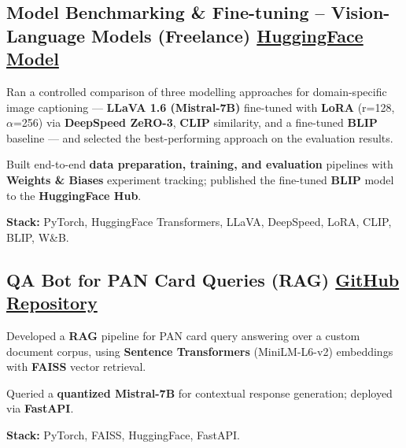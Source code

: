\documentclass[letter,10pt]{article}
\begin{document}
\subsection{Model Benchmarking \& Fine-tuning -- Vision-Language Models (Freelance) \hfill \href{https://huggingface.co/sunil448832/blip-model}{HuggingFace Model}}
\begin{zitemize}
\item Ran a controlled comparison of three modelling approaches for domain-specific image captioning --- \textbf{LLaVA 1.6 (Mistral-7B)} fine-tuned with \textbf{LoRA} (r=128, $\alpha$=256) via \textbf{DeepSpeed ZeRO-3}, \textbf{CLIP} similarity, and a fine-tuned \textbf{BLIP} baseline --- and selected the best-performing approach on the evaluation results.
\item Built end-to-end \textbf{data preparation, training, and evaluation} pipelines with \textbf{Weights \& Biases} experiment tracking; published the fine-tuned \textbf{BLIP} model to the \textbf{HuggingFace Hub}.
\item \textbf{Stack:} PyTorch, HuggingFace Transformers, LLaVA, DeepSpeed, LoRA, CLIP, BLIP, W\&B.
\end{zitemize}

\subsection{QA Bot for PAN Card Queries (RAG) \hfill \href{https://github.com/sunil448832/Natural-Language-Processing/tree/master/RAG(Retrieval\%20Augment\%20Generation)}{GitHub Repository}}
\begin{zitemize}
\item Developed a \textbf{RAG} pipeline for PAN card query answering over a custom document corpus, using \textbf{Sentence Transformers} (MiniLM-L6-v2) embeddings with \textbf{FAISS} vector retrieval.
\item Queried a \textbf{quantized Mistral-7B} for contextual response generation; deployed via \textbf{FastAPI}.
\item \textbf{Stack:} PyTorch, FAISS, HuggingFace, FastAPI.
\end{zitemize}
\end{document}
